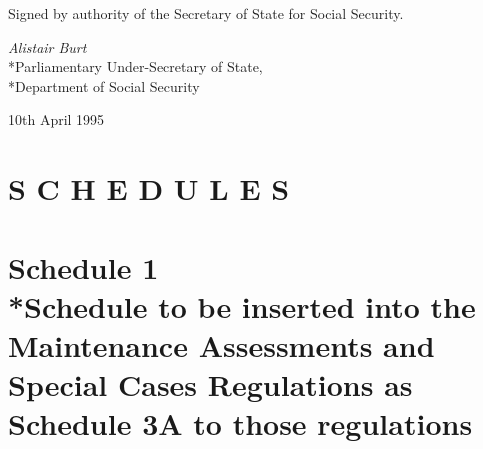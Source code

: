 \documentclass[a4paper]{article}
\newcommand{\parthead}{}
\begin{document}
\bigskip

Signed by authority of the Secretary of State for Social Security.

{\raggedleft
\emph{Alistair Burt}\\*Parliamentary Under-Secretary of State,\\*Department of Social Security

}

10th April 1995

\clearpage

\part*{S C H E D U L E S}

\part[Schedule 1 --- Schedule to be inserted into the Maintenance Assessments and Special Cases Regulations as Schedule 3A to those regulations]{Schedule 1\\*Schedule to be inserted into the Maintenance Assessments and Special Cases Regulations as Schedule 3A to those regulations}

\renewcommand\parthead{--- Schedule 1}
\end{document}
